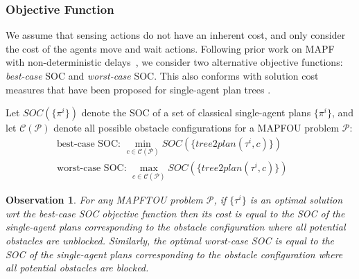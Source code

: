 \documentclass[letterpaper]{article} %
\newcommand{\blocked}{\textit{blocked}}
\newcommand{\unblocked}{\textit{unblocked}}
\newcommand{\toplan}{\textit{tree2plan}}
\newtheorem{observation}{Observation}
\begin{document}
\subsubsection*{Objective Function}


We assume that sensing actions do not have an inherent cost, and only consider the cost of the agents move and wait actions.
Following prior work on MAPF with non-deterministic delays~\cite{shahar2021safe}, we consider two alternative objective functions: \emph{best-case} SOC and \emph{worst-case} SOC.
This also conforms with solution cost measures that have been proposed for single-agent plan trees \cite{shmaryahu2019comparative}.


Let $SOC(\{\pi^i\})$ denote the SOC of a set of classical single-agent plans $\{\pi^i\}$, and let $\mathcal{C}(\mathcal{P})$ denote all possible obstacle configurations for a MAPFOU problem $\mathcal{P}$:
\begin{eqnarray}
 \mbox{best-case SOC: } \min_{c\in\mathcal{C}(\mathcal{P})} SOC(\{\toplan(\tau^i,c)\}) &&\\
 \mbox{worst-case SOC: } \max_{c\in\mathcal{C}(\mathcal{P})} SOC(\{\toplan(\tau^i,c)\})&&
\end{eqnarray}


\begin{observation}
For any MAPFTOU problem $\mathcal{P}$, if $\{\tau^i\}$ is an optimal solution wrt
the best-case SOC objective function then its cost is equal to the SOC of the single-agent plans corresponding to the obstacle configuration where all potential obstacles are \unblocked.
Similarly, the optimal worst-case SOC is equal to the SOC of the single-agent plans corresponding to the obstacle configuration where all potential obstacles are \blocked.
\label{obs:best-and-worst}
\end{observation}




\end{document}
